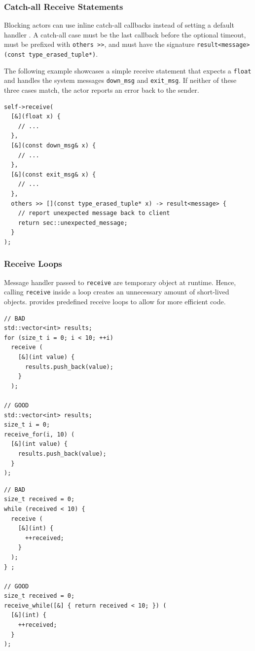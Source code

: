 \subsubsection{Catch-all Receive Statements}
\label{catch-all}

Blocking actors can use inline catch-all callbacks instead of setting a default handler . A catch-all case must be the last callback before the optional timeout, must be prefixed with \lstinline^others >>^, and must have the signature \lstinline^result<message> (const type_erased_tuple*)^.

The following example showcases a simple receive statement that expects a \lstinline^float^ and handles the system messages \lstinline^down_msg^ and \lstinline^exit_msg^. If neither of these three cases match, the actor reports an error back to the sender.

\begin{lstlisting}
self->receive(
  [&](float x) {
    // ...
  },
  [&](const down_msg& x) {
    // ...
  },
  [&](const exit_msg& x) {
    // ...
  },
  others >> [](const type_erased_tuple* x) -> result<message> {
    // report unexpected message back to client
    return sec::unexpected_message;
  }
);
\end{lstlisting}

\clearpage
\subsubsection{Receive Loops}
\label{receive-loop}

Message handler passed to \lstinline^receive^ are temporary object at runtime.
Hence, calling \lstinline^receive^ inside a loop creates an unnecessary amount of short-lived objects.
\lib provides predefined receive loops to allow for more efficient code.

\begin{lstlisting}
// BAD
std::vector<int> results;
for (size_t i = 0; i < 10; ++i)
  receive (
    [&](int value) {
      results.push_back(value);
    }
  );

// GOOD
std::vector<int> results;
size_t i = 0;
receive_for(i, 10) (
  [&](int value) {
    results.push_back(value);
  }
);
\end{lstlisting}

\begin{lstlisting}
// BAD
size_t received = 0;
while (received < 10) {
  receive (
    [&](int) {
      ++received;
    }
  );
} ;

// GOOD
size_t received = 0;
receive_while([&] { return received < 10; }) (
  [&](int) {
    ++received;
  }
);
\end{lstlisting}
\clearpage

